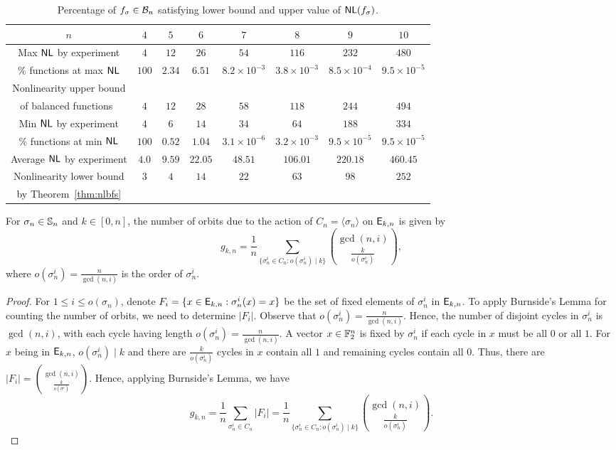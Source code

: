 \documentclass{llncs}
\begin{document}
\begin{table}[h!]
\centering
\begin{tabular}{|c|c|c|c||c|c|c|c|}\hline
$n$ & $4$ & $5$ & $6$ & $7$ & $8$ & $9$ & $10$\\ \hline\hline
Max $\mathsf{NL}$ by experiment & $4$ & $12$ & $26$ & $54$ & $116$ & $232$ & $480$\\ \hline
\% functions at max $\mathsf{NL}$ & $100$ & $2.34$ & $6.51$ & $8.2 \times 10^{-3}$ & $3.8 \times 10^{-3}$ & $8.5 \times 10^{-4}$ & $9.5 \times 10^{-5}$\\ \hline
Nonlinearity upper bound & & & & & & &\\
of balanced functions~\cite{SZZ95} & $4$ & $12$ & $28$ & $58$ & $118$ & $244$ & $494$\\ \hline
Min $\mathsf{NL}$ by experiment & $4$ & $6$ & $14$ & $34$ & $64$ & $188$ & $334$\\ \hline
\% functions at min $\mathsf{NL}$ & $100$ & $0.52$ & $1.04$ & $3.1 \times 10^{-6}$ & $3.2 \times 10^{-3}$ & $9.5 \times 10^{-5}$ & $9.5 \times 10^{-5}$\\ \hline
Average $\mathsf{NL}$ by experiment & $4.0$ & $9.59$ & $22.05$ & $48.51$ & $106.01$  & $220.18$ & $460.45$\\ \hline
Nonlinearity lower bound & $3$ & $4$ & $14$ & $22$ & $63$ & $98$ & $252$\\
by Theorem~\ref{thm:nlbfs} & & & & & & &\\ \hline
\end{tabular}
\caption{Percentage of $f_\sigma \in \mathcal{B}_n$ satisfying lower bound and upper value of $\mathsf{NL}(f_\sigma)$.\label{tab:NLminmaxsigma}}
\end{table}

\begin{theorem}\label{thm:resorb}
For $\sigma_n \in \mathbb{S}_n$ and $k \in [0,n]$, the number of orbits due to the action of $C_n = \langle\sigma_n\rangle$ on $\mathsf{E}_{k,n}$ is given by
$$g_{k,n}= \frac{1}{n} \sum\limits_{\{\sigma_n^i \in C_n : o(\sigma_n^i) \mid k \}} {\gcd(n,i)  \choose \frac{k}{o(\sigma_n^i)}},$$
where $o(\sigma_n^i) = \frac{n}{\gcd(n,i)}$ is the order of $\sigma_n^i$. 
\end{theorem}

\begin{proof}
For $1 \leq i \leq o(\sigma_n)$, denote $F_i = \{x \in \mathsf{E}_{k,n}: \sigma_n^i(x) = x \}$ be the set of fixed elements of $\sigma_n^i$ in $\mathsf{E}_{k,n}$. To apply Burnside's Lemma for counting the number of orbits, we need to determine $|F_i|$. Observe that $o(\sigma_n^i) = \frac{n}{\gcd(n,i)}$. Hence, the number of disjoint cycles in $\sigma_n^i$ is $\gcd(n,i)$, with each cycle having length $o(\sigma_n^i) = \frac{n}{\gcd(n,i)}$. A vector $x \in \mathbb{F}_2^n$ is fixed by $\sigma_n^i$ if each cycle in $x$ must be all $0$ or all $1$. For $x$ being in $\mathsf{E}_{k,n}$, $o(\sigma_n^i) \mid k$ and there are $\frac{k}{o(\sigma_n^i)}$ cycles in $x$ contain all $1$ and remaining cycles contain all $0$. Thus, there are $|F_i| = {\gcd(n,i)  \choose \frac{k}{o(\sigma^i)}}$. Hence, applying Burnside's Lemma, we have
$$g_{k,n}= \frac{1}{n} \sum_{\sigma_n^i \in C_n} |F_i| =  \frac{1}{n} \sum\limits_{\{\sigma_n^i \in C_n : o(\sigma_n^i) \mid k \}} {\gcd(n,i)  \choose \frac{k}{o(\sigma_n^i)}}.$$     
\end{proof}
\end{document}
